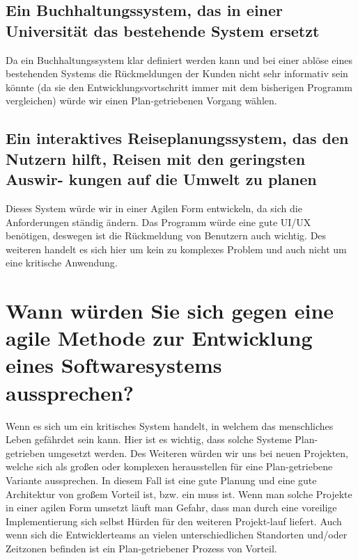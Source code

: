 \documentclass[12pt]{article}
\begin{document}
\subsection{Ein Buchhaltungssystem, das in einer Universität das bestehende System ersetzt}
Da ein Buchhaltungssystem klar definiert werden kann und bei einer ablöse eines bestehenden Systems die Rückmeldungen der Kunden nicht sehr informativ sein könnte (da sie den Entwicklungsvortschritt immer mit dem bisherigen Programm vergleichen) würde wir einen Plan-getriebenen Vorgang wählen.
\subsection{Ein interaktives Reiseplanungssystem, das den Nutzern hilft, Reisen mit den geringsten Auswir-
kungen auf die Umwelt zu planen}
Dieses System würde wir in einer Agilen Form entwickeln, da sich die Anforderungen ständig ändern. Das Programm würde eine gute UI/UX benötigen, deswegen ist die Rückmeldung von Benutzern auch wichtig. Des weiteren handelt es sich hier um kein zu komplexes Problem und auch nicht um eine kritische Anwendung.
\section{Wann würden Sie sich gegen eine agile Methode zur Entwicklung eines Softwaresystems aussprechen?}
Wenn es sich um ein kritisches System handelt, in welchem das menschliches Leben gefährdet sein kann. Hier ist es wichtig, dass solche Systeme Plan-getrieben umgesetzt werden.
Des Weiteren würden wir uns bei neuen Projekten, welche sich als großen oder komplexen herausstellen für eine Plan-getriebene Variante aussprechen. In diesem Fall ist eine gute Planung und eine gute Architektur von großem Vorteil ist, bzw. ein muss ist. Wenn man solche Projekte in einer agilen Form umsetzt läuft man Gefahr, dass man durch eine voreilige Implementierung sich selbst Hürden für den weiteren Projekt-lauf liefert. Auch wenn sich die Entwicklerteams an vielen unterschiedlichen Standorten und/oder Zeitzonen befinden ist ein Plan-getriebener Prozess von Vorteil.
\pagebreak
\end{document}
